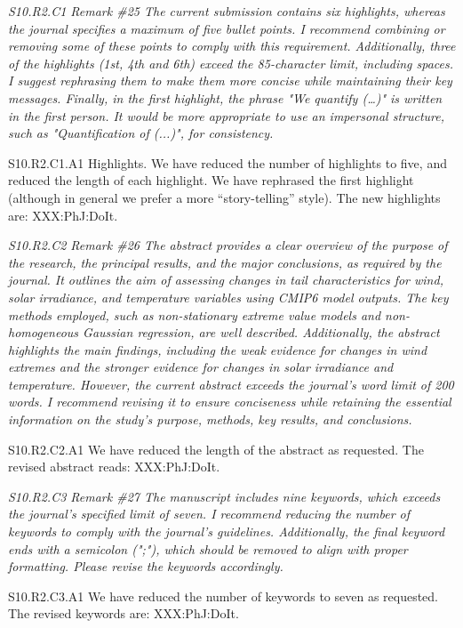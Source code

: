 \documentclass[a4paper,10pt]{article}
\begin{document}
	\emph{S10.R2.C1 Remark \#25 The current submission contains six highlights, whereas the journal specifies a maximum of five bullet points. I recommend combining or removing some of these points to comply with this requirement. Additionally, three of the highlights (1st, 4th and 6th) exceed the 85-character limit, including spaces. I suggest rephrasing them to make them more concise while maintaining their key messages. Finally, in the first highlight, the phrase "We quantify (…)" is written in the first person. It would be more appropriate to use an impersonal structure, such as "Quantification of (...)", for consistency.}

	S10.R2.C1.A1 Highlights. We have reduced the number of highlights to five, and reduced the length of each highlight. We have rephrased the first highlight (although in general we prefer a more ``story-telling'' style). The new highlights are: XXX:PhJ:DoIt.

	\emph{S10.R2.C2 Remark \#26 The abstract provides a clear overview of the purpose of the research, the principal results, and the major conclusions, as required by the journal. It outlines the aim of assessing changes in tail characteristics for wind, solar irradiance, and temperature variables using CMIP6 model outputs. The key methods employed, such as non-stationary extreme value models and non-homogeneous Gaussian regression, are well described. Additionally, the abstract highlights the main findings, including the weak evidence for changes in wind extremes and the stronger evidence for changes in solar irradiance and temperature. However, the current abstract exceeds the journal's word limit of 200 words. I recommend revising it to ensure conciseness while retaining the essential information on the study's purpose, methods, key results, and conclusions.}
	
	S10.R2.C2.A1 We have reduced the length of the abstract as requested. The revised abstract reads: XXX:PhJ:DoIt.

	\emph{S10.R2.C3 Remark \#27 The manuscript includes nine keywords, which exceeds the journal's specified limit of seven. I recommend reducing the number of keywords to comply with the journal's guidelines. Additionally, the final keyword ends with a semicolon (";"), which should be removed to align with proper formatting. Please revise the keywords accordingly.}

	S10.R2.C3.A1 We have reduced the number of keywords to seven as requested. The revised keywords are: XXX:PhJ:DoIt.
\end{document}
